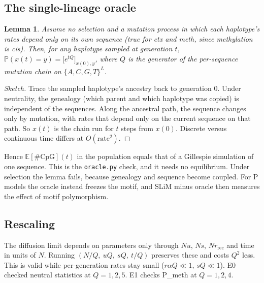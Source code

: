 \documentclass[11pt]{article}
\newtheorem{lemma}{Lemma}
\theoremstyle{definition}
\newcommand{\E}{\mathbb{E}}
\renewcommand{\Pr}{\mathbb{P}}
\begin{document}
\subsection{The single-lineage oracle}
\begin{lemma}
Assume no selection and a mutation process in which each haplotype's rates depend only on its own sequence (true for
ctx and meth, since methylation is cis). Then, for any haplotype sampled at generation $t$,
$\Pr(x(t)=y)=\big[e^{tQ}\big]_{x(0),y}$, where $Q$ is the generator of the per-sequence mutation chain on
$\{A,C,G,T\}^L$.
\end{lemma}
\begin{proof}[Sketch]
Trace the sampled haplotype's ancestry back to generation $0$. Under neutrality, the genealogy (which parent and which
haplotype was copied) is independent of the sequences. Along the ancestral path, the sequence changes only by
mutation, with rates that depend only on the current sequence on that path. So $x(t)$ is the chain run for $t$ steps
from $x(0)$. Discrete versus continuous time differs at $O(\text{rate}^2)$.
\end{proof}
Hence $\E[\#\text{CpG}](t)$ in the population equals that of a Gillespie simulation of one sequence. This is the
\texttt{oracle.py} check, and it needs no equilibrium. Under selection the lemma fails, because genealogy and
sequence become coupled. For P models the oracle instead freezes the motif, and SLiM minus oracle then measures the
effect of motif polymorphism.

\subsection{Rescaling}
The diffusion limit depends on parameters only through $Nu$, $Ns$, $Nr_{\text{rec}}$ and time in units of $N$. Running
$(N/Q,\ uQ,\ sQ,\ t/Q)$ preserves these and costs $Q^2$ less. This is valid while per-generation rates stay small
($r\alpha Q\ll1$, $sQ\ll1$). E0 checked neutral statistics at $Q=1,2,5$. E1 checks P\_meth at $Q=1,2,4$.
\end{document}
